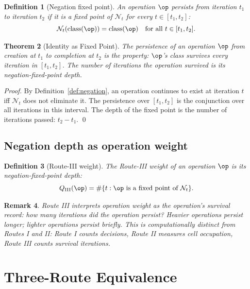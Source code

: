 \documentclass[twocolumn,11pt,a4paper]{article}
\newtheorem{theorem}{Theorem}[section]
\newtheorem{definition}[theorem]{Definition}
\newtheorem{remark}[theorem]{Remark}
\newcommand{\Qweight}{Q}
\newcommand{\Negation}{\mathcal{N}}
\begin{document}
\begin{definition}[Negation fixed point]
\label{def:negation-fp}
An operation $\op$ \emph{persists} from iteration $t_1$ to iteration $t_2$ if it is a fixed point of $\Negation_t$ for every $t \in [t_1, t_2]$:
\[
\Negation_t(\mathrm{class}(\op)) = \mathrm{class}(\op) \quad \text{for all } t \in [t_1, t_2].
\]
\end{definition}

\begin{theorem}[Identity as Fixed Point]
\label{thm:identity-fp}
The persistence of an operation $\op$ from creation at $t_1$ to completion at $t_2$ is the property: $\op$'s class survives every iteration in $[t_1, t_2]$. The number of iterations the operation survived is its negation-fixed-point depth.
\end{theorem}

\begin{proof}
By Definition~\ref{def:negation}, an operation continues to exist at iteration $t$ iff $\Negation_t$ does not eliminate it. The persistence over $[t_1, t_2]$ is the conjunction over all iterations in this interval. The depth of the fixed point is the number of iterations passed: $t_2 - t_1$. \qed
\end{proof}

\subsection{Negation depth as operation weight}

\begin{definition}[Route-III weight]
\label{def:weight-iii}
The \emph{Route-III weight} of an operation $\op$ is its negation-fixed-point depth:
\[
\Qweight_\mathrm{III}(\op) = \#\{t : \op \text{ is a fixed point of } \Negation_t\}.
\]
\end{definition}

\begin{remark}
Route III interprets operation weight as the operation's survival record: how many iterations did the operation persist? Heavier operations persist longer; lighter operations persist briefly. This is computationally distinct from Routes I and II: Route I counts decisions, Route II measures cell occupation, Route III counts survival iterations.
\end{remark}

\section{Three-Route Equivalence}
\label{sec:three-route}
\end{document}
